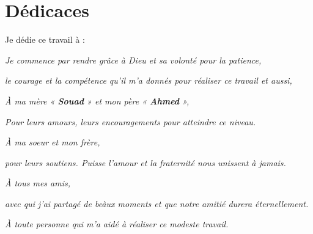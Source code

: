 \chapter*{\Huge Dédicaces}

\begingroup
\begin{center}

    \it\large \raggedright Je dédie ce travail à :
    \end{center}
    \vspace{4mm}
    \begin{center}
  \it\large  Je commence par rendre grâce à Dieu et sa volonté pour la patience,\\
  \end{center}
  \begin{center}
       \it\large le courage et la compétence 
          qu’il m’a donnés pour réaliser ce travail et aussi,\\
          \end{center}
 \vspace{4mm}
 \begin{center}
     

             \it\large À ma mère « \textbf{Souad} » et mon père « \textbf{Ahmed} »,\\
              \end{center}
              \begin{center}
                   
               
\it\large Pour leurs amours, leurs encouragements pour atteindre ce niveau.\\
                     \end{center}
 \vspace{4mm}
 \begin{center}
     

\it\large  À ma soeur et mon frère,\\
 \end{center}
 \begin{center}
     

\it\large  pour leurs soutiens. Puisse l’amour et la fraternité nous unissent à jamais.
 \end{center}
 \vspace{4mm}
 \begin{center}
     

\it\large À tous mes amis,\\
 \end{center}
 \begin{center}

\it\large avec qui j’ai partagé de beàux moments et que notre amitié durera éternellement.
\\
     
 \end{center}
\begin{center}

\it\large À toute personne qui m’a aidé à réaliser ce modeste travail. 
\end{center}
\endgroup

\vspace{8mm}
\begin{flushright}
    \it\LARGE \@author
\end{flushright}

